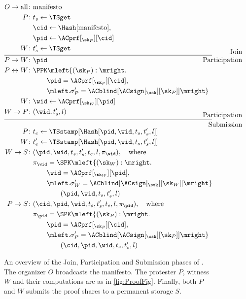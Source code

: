 \begin{figure}
  \centering
  \begin{minipage}{\linewidth}
    \begin{align*}
      O\to \text{all}\colon & \text{manifesto} \\
      P\colon & t_s\gets \TSget \\
        & \cid\gets \Hash[\text{manifesto}], \\
        & \pid\gets \ACprf[_{\sk_P}][\cid] \\
      W\colon & t_s'\gets \TSget
      \\[-1em]
      \noalign{\hfill Join}
      \midrule
      \noalign{\hfill Participation}
      \\[-3em]
      P\to W\colon & \pid \\
      P\leftrightarrow W\colon &
        \PPK\mleft\{ (\sk_P) : \mright. \\
        & \qquad \pid = \ACprf[_{\sk_P}][\cid], \\
        & \qquad \mleft. \sigma_P' = \ACblind[\ACsign[_{\ssk}][\sk_P]] \mright\} 
        \\
      W\colon & \wid\gets \ACprf[_{\sk_W}][\pid] \\
      W\to P\colon & (\wid, t_s', l)
      \\[-1em]
      \noalign{\hfill Participation}
      \midrule
      \noalign{\hfill Submission}
      \\[-2em]
      P\colon & t_e\gets \TSstamp[\Hash[\pid, \wid, t_s, t_s', l]] \\
      W\colon & t_e'\gets \TSstamp[\Hash[\pid, \wid, t_s, t_s', l]] \\
      W\to S\colon & (\pid, \wid, t_s, t_s', t_e, l, \pi_{\wid}),\quad 
      \text{where} \\
        & \pi_{\wid} = \SPK\mleft\{ (\sk_W) : \mright. \\
        & \qquad \wid = \ACprf[_{\sk_W}][\pid], \\
        & \qquad \mleft. \sigma_W' = \ACblind[\ACsign[_{\ssk}][\sk_W]]\mright\} 
        \\
        & \qquad\qquad (\pid, \wid, t_s, t_s', l) \\
      P\to S\colon & (\cid, \pid, \wid, t_s, t_s', t_e, l, \pi_{\pid}),\quad 
      \text{where}\\
        & \pi_{\pid} = \SPK\mleft\{ (\sk_P) : \mright. \\
        & \qquad \pid = \ACprf[_{\sk_P}][\cid], \\
        & \qquad \mleft. \sigma_P' = \ACblind[\ACsign[_{\ssk}][\sk_P]] \mright\} 
        \\
        & \qquad\qquad (\cid, \pid, \wid, t_s, t_s', l)
    \end{align*}
  \end{minipage}
  \caption{%
    An overview of the Join, Participation and Submission phases of \PRIVO.\@
    The organizer \(O\) broadcasts the manifesto.
    The protester \(P\), witness \(W\) and their computations are as in \cref{fig:ProofFig}.
    Finally, both \(P\) and \(W\) submits the proof shares to a permanent storage \(S\).
  }%
  \label{fig:ProtocolOverview}
\end{figure}

